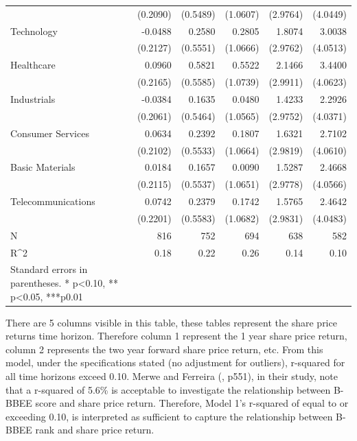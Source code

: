 \begin{table}[H]
{\begin{tabular}{lrrrrr}
                   & (0.2090)  & (0.5489)  & (1.0607)   & (2.9764)  & (4.0449)   \\
Technology         & -0.0488   & 0.2580    & 0.2805     & 1.8074    & 3.0038     \\
                   & (0.2127)  & (0.5551)  & (1.0666)   & (2.9762)  & (4.0513)   \\
Healthcare         & 0.0960    & 0.5821    & 0.5522     & 2.1466    & 3.4400     \\
                   & (0.2165)  & (0.5585)  & (1.0739)   & (2.9911)  & (4.0623)   \\
Industrials        & -0.0384   & 0.1635    & 0.0480     & 1.4233    & 2.2926     \\
                   & (0.2061)  & (0.5464)  & (1.0565)   & (2.9752)  & (4.0371)   \\
Consumer Services  & 0.0634    & 0.2392    & 0.1807     & 1.6321    & 2.7102     \\
                   & (0.2102)  & (0.5533)  & (1.0664)   & (2.9819)  & (4.0610)   \\
Basic Materials    & 0.0184    & 0.1657    & 0.0090     & 1.5287    & 2.4668     \\
                   & (0.2115)  & (0.5537)  & (1.0651)   & (2.9778)  & (4.0566)   \\
Telecommunications & 0.0742    & 0.2379    & 0.1742     & 1.5765    & 2.4642     \\
                   & (0.2201)  & (0.5583)  & (1.0682)   & (2.9831)  & (4.0483)   \\
N                  & 816       & 752       & 694        & 638       & 582        \\
R^2                 & 0.18      & 0.22      & 0.26       & 0.14      & 0.10       \\
   \bottomrule
Standard errors in parentheses.
* p<0.10, ** p<0.05, ***p0.01\
\end{tabular}}
\end{table} 
There are 5 columns visible in this table, these tables represent the share price returns time horizon. Therefore column 1 represent the 1 year share price return, column 2 represents the two year forward share price return, etc. From this model, under the specifications stated (no adjustment for outliers), r-squared for all time horizons exceed 0.10. Merwe and Ferreira (\citeyear{N7}, p551), in their study, note that a r-squared of 5.6\% is acceptable to investigate the relationship between B-BBEE score and share price return. Therefore, Model 1’s r-squared of equal to or exceeding 0.10, is interpreted as sufficient to capture the relationship between B-BBEE rank and share price return. 

